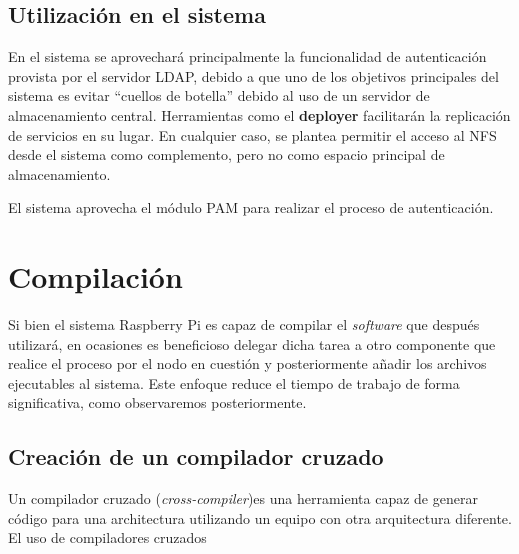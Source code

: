 \subsection{Utilización en el sistema}

En el sistema se aprovechará principalmente la funcionalidad de autenticación provista por el servidor LDAP, debido a que uno de los objetivos principales del sistema es evitar ``cuellos de botella'' debido al uso de un servidor de almacenamiento central. Herramientas como el \textbf{deployer} facilitarán la replicación de servicios en su lugar. En cualquier caso, se plantea permitir el acceso al NFS desde el sistema como complemento, pero no como espacio principal de almacenamiento.

El sistema aprovecha el módulo PAM para realizar el proceso de autenticación.

\section{Compilación}

Si bien el sistema Raspberry Pi es capaz de compilar el \textit{software} que después utilizará, en ocasiones es beneficioso delegar dicha tarea a otro componente que realice el proceso por el nodo en cuestión y posteriormente añadir los archivos ejecutables al sistema. Este enfoque reduce el tiempo de trabajo de forma significativa, como observaremos posteriormente.%

\subsection{Creación de un compilador cruzado}

Un compilador cruzado (\textit{cross-compiler})es una herramienta capaz de generar código para una architectura utilizando un equipo con otra arquitectura diferente.%
El uso de compiladores cruzados 